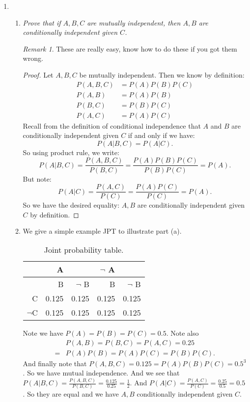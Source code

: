\documentclass[12pt,oneside,reqno]{amsart}
\theoremstyle{plain}
\theoremstyle{definition}
\theoremstyle{remark}
\newtheorem{rem}[theorem]{Remark}
\newcommand{\bee}{\begin{equation}\begin{aligned}}
\newcommand{\eee}{\end{aligned}\end{equation}}
\newcommand{\fracc}{\frac}
\begin{document}
\begin{enumerate}[label=\arabic*.]
\item \begin{enumerate}
\item 
\textit{Prove that if $A,B,C$ are mutually independent, then $A,B$ are conditionally independent given $C$. }

\begin{rem}
These are really easy, know how to do these if you got them wrong. 
\end{rem}

\begin{proof}
Let $A,B,C$ be mutually independent. Then we know by definition:
\bee
P(A,B,C) &= P(A)P(B)P(C)\\
P(A,B) &= P(A)P(B)\\
P(B,C) &= P(B)P(C)\\
P(A,C) &= P(A)P(C)
\eee
Recall from the definition of conditional independence that $A$ and $B$ are conditionally independent given $C$ if and only if we have:
$$
P(A|B,C) = P(A|C).
$$
So using product rule, we write:
$$
P(A|B,C) = \fracc{P(A,B,C)}{P(B,C)} = \fracc{P(A)P(B)P(C)}{P(B)P(C)} = P(A).
$$
But note:
$$
P(A|C) = \fracc{P(A,C)}{P(C)} = \fracc{P(A)P(C)}{P(C)} = P(A). 
$$
So we have the desired equality: $A,B$ are conditionally independent given $C$ by definition. 
\end{proof}

\item We give a  simple example JPT to illustrate part (a). 

\begin{table}[H]
  \centering
  \caption{Joint probability table.}
    \begin{tabular}{r|r|r|r|r}
    \toprule
   & A & & $\neg$ A\\
   \hline
   & B & $\neg$ B & B & $\neg$ B\\
   \midrule
    C     & 0.125   & 0.125   & 0.125  & 0.125 \\
    $\neg$C    & 0.125   & 0.125  & 0.125  & 0.125 \\
    \end{tabular}%
  \label{tab:addlabel}%
\end{table}%

Note we have $P(A) = P(B) = P(C) = 0.5$. Note also 
\bee
&P(A,B) = P(B,C) = P(A,C) = 0.25 \\
= &P(A)P(B) = P(A)P(C) = P(B)P(C).
\eee
And finally note that $P(A,B,C) = 0.125 = P(A)P(B)P(C) = 0.5^3$. So we have mutual independence. And we see that $P(A|B,C) = \fracc{P(A,B,C)}{P(B,C)} = \fracc{0.125}{0.25} = \fracc{1}{2}$. And $P(A|C) = \fracc{P(A,C)}{P(C)} = \fracc{0.25}{0.5} = 0.5$. So they are equal and we have $A,B$ conditionally independent given $C$. 


\end{enumerate}
\end{enumerate}
\end{document}

